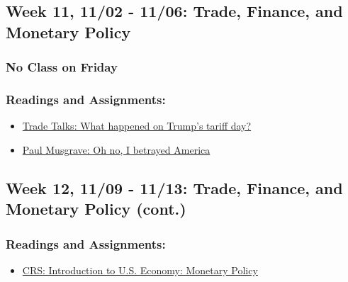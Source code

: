 \documentclass[
  letterpaper,
  DIV=11,
  numbers=noendperiod]{scrartcl}
\providecommand{\tightlist}{%
  \setlength{\itemsep}{0pt}\setlength{\parskip}{0pt}}
\begin{document}
\subsection{Week 11, 11/02 - 11/06: Trade, Finance, and Monetary
Policy}\label{week-11-1102---1106-trade-finance-and-monetary-policy}

\subsubsection{\texorpdfstring{\textbf{No Class on
Friday}}{No Class on Friday}}\label{no-class-on-friday}

\subsubsection{Readings and
Assignments:}\label{readings-and-assignments-10}

\begin{itemize}
\tightlist
\item
  \href{https://tradetalkspodcast.com/podcast/207-what-happened-on-trumps-tariff-day/}{Trade
  Talks: What happened on Trump's tariff day?}
\item
  \href{https://musgrave.substack.com/p/oh-no-i-betrayed-america}{Paul
  Musgrave: Oh no, I betrayed America}
\end{itemize}

\subsection{Week 12, 11/09 - 11/13: Trade, Finance, and Monetary Policy
(cont.)}\label{week-12-1109---1113-trade-finance-and-monetary-policy-cont.}

\subsubsection{Readings and
Assignments:}\label{readings-and-assignments-11}

\begin{itemize}
\tightlist
\item
  \href{https://www.congress.gov/crs_external_products/IF/PDF/IF11751/IF11751.12.pdf}{CRS:
  Introduction to U.S. Economy: Monetary Policy}
\end{itemize}
\end{document}
